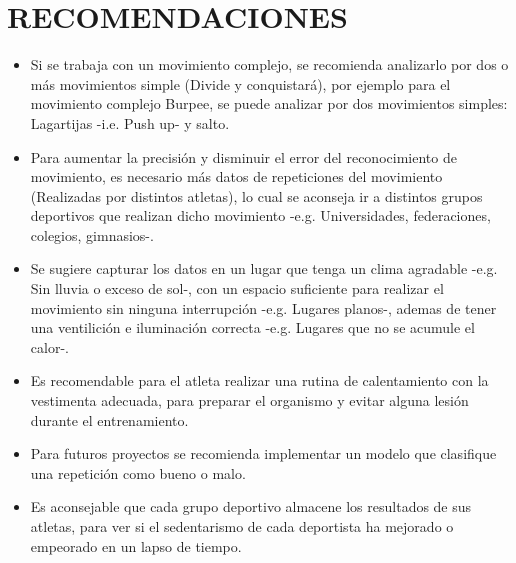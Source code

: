 \section{RECOMENDACIONES} \label{ded:rec}
\begin{itemize}
\item Si se trabaja con un movimiento complejo, se recomienda analizarlo por dos o m\'as movimientos simple (Divide y conquistar\'a), por ejemplo para el movimiento complejo Burpee, se puede analizar por dos movimientos simples: Lagartijas -i.e. Push up- y salto.
\item Para aumentar la precisi\'on y disminuir el error del reconocimiento de movimiento, es necesario m\'as datos de  repeticiones del movimiento (Realizadas por distintos atletas), lo cual se aconseja ir a distintos grupos deportivos que realizan dicho movimiento -e.g. Universidades, federaciones, colegios, gimnasios-.
\item Se sugiere capturar los datos en un  lugar que tenga un clima agradable -e.g. Sin lluvia o exceso de sol-, con un espacio suficiente para realizar el movimiento sin ninguna interrupci\'on -e.g. Lugares planos-, ademas de tener una  ventilici\'on e iluminaci\'on correcta -e.g. Lugares que no se acumule  el calor-.
\item Es recomendable para el atleta realizar una rutina de calentamiento con la vestimenta adecuada, para preparar el organismo y evitar alguna lesi\'on durante el entrenamiento.
\item Para futuros proyectos se recomienda implementar un modelo que clasifique una repetici\'on como bueno o malo.
\item Es aconsejable que cada grupo deportivo almacene los resultados de sus atletas, para ver si el sedentarismo de cada deportista ha mejorado o empeorado en un lapso de tiempo.
\end{itemize}